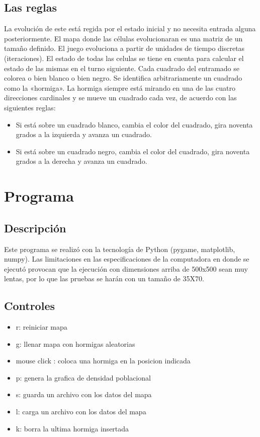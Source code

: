 \documentclass[10pt]{article}
\begin{document}
        \subsection{Las reglas}
            La evolución de este está regida por el estado inicial y no necesita entrada alguna posteriormente. El mapa donde las células evolucionaran es una matriz de un tamaño definido.  El juego evoluciona a partir de unidades de tiempo discretas (iteraciones). El estado de todas las celulas se tiene en cuenta para calcular el estado de las mismas en el turno siguiente.
            Cada cuadrado del entramado se colorea o bien blanco o bien negro. Se identifica arbitrariamente un cuadrado como la «hormiga». La hormiga siempre está mirando en una de las cuatro direcciones cardinales y se mueve un cuadrado cada vez, de acuerdo con las siguientes reglas:
            \begin{itemize}
                \item Si está sobre un cuadrado blanco, cambia el color del cuadrado, gira noventa grados a la izquierda y avanza un cuadrado.
                \item Si está sobre un cuadrado negro, cambia el color del cuadrado, gira noventa grados a la derecha y avanza un cuadrado.
            \end{itemize}
		
        

    
    \section{Programa}	
		\subsection{Descripción}
        Este programa se realizó con la tecnología de Python (pygame, matplotlib, numpy). Las limitaciones en las especificaciones de la computadora en donde se ejecutó provocan que la ejecución con dimensiones arriba de 500x500 sean muy lentas, por lo que las pruebas se harán con un tamaño de 35X70.
        \subsection*{Controles}
            \begin{itemize}
                \item r: reiniciar mapa
                \item g: llenar mapa con hormigas aleatorias
                \item mouse click : coloca una hormiga en la posicion indicada
                \item p: genera la grafica de densidad poblacional
                \item s: guarda un archivo con los datos del mapa
                \item l: carga un archivo con los datos del mapa
                \item k: borra la ultima hormiga insertada
            \end{itemize}
\end{document}
